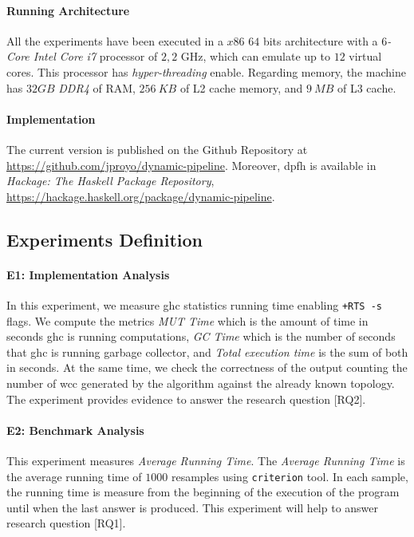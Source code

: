 \paragraph{Running Architecture}
All the experiments have been executed in a $x86$ $64$ bits architecture with a \textit{$6$-Core Intel Core i7} processor of $2,2$ GHz, which can emulate up to $12$ virtual cores. This processor has \emph{hyper-threading} enable. Regarding memory, the machine has $32 GB$ \emph{DDR4} of RAM, $256\ KB$ of L2 cache memory, and $9\ MB$ of L3 cache.

\paragraph{Implementation}
The current version is published on the Github Repository at \url{https://github.com/jproyo/dynamic-pipeline}. Moreover, \acrshort{dpfh}  is available in \textit{Hackage: The Haskell Package Repository}, \url{https://hackage.haskell.org/package/dynamic-pipeline}.
\subsection{Experiments Definition}\label{sub:new:exp:def}
\paragraph{E1: Implementation Analysis}
In this experiment, we measure \acrshort{ghc} statistics running time enabling \texttt{+RTS -s} flags. We compute the metrics \emph{MUT Time} which is the amount of time in seconds \acrshort{ghc} is running computations, \emph{GC Time} which is the number of seconds that \acrshort{ghc} is running garbage collector, and \emph{Total execution time} is the sum of both in seconds. At the same time, we check the correctness of the output counting the number of \acrshort{wcc} generated by the algorithm against the already known topology. 
The experiment provides evidence to answer the research question [RQ2].

\paragraph{E2: Benchmark Analysis}
This experiment measures \emph{Average Running Time}.
The \emph{Average Running Time} is the average running time of $1000$ resamples using \texttt{criterion} tool. 
In each sample, the running time is measure from the beginning of the execution of the program until when the last answer is produced.
This experiment will help to answer research question [RQ1].

